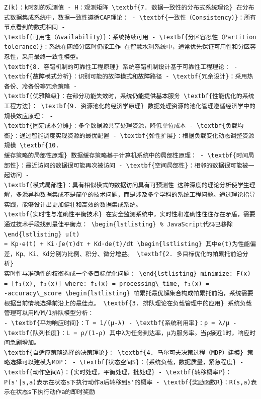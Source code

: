 \begin{verbatim}
Z(k)：k时刻的观测值 - H：观测矩阵 \textbf{7. 数据一致性的分布式系统理论} 在分布式数据集成系统中，数据一致性遵循CAP理论： - \textbf{一致性（Consistency）}：所有节点看到的数据相同 -
\textbf{可用性（Availability）}：系统持续可用 - \textbf{分区容忍性（Partition tolerance）}：系统在网络分区时仍能工作 在智慧水利系统中，通常优先保证可用性和分区容忍性，采用最终一致性模型。
\textbf{8. 容错机制的可靠性工程原理} 系统容错机制设计基于可靠性工程理论： - \textbf{故障模式分析}：识别可能的故障模式和故障路径 - \textbf{冗余设计}：采用热备份、冷备份等冗余策略 -
\textbf{优雅降级}：在部分功能失效时，系统仍能提供基本服务 \textbf{性能优化的系统工程方法}： \textbf{9. 资源池化的经济学原理} 数据处理资源的池化管理遵循经济学中的规模效应原理： -
\textbf{固定成本分摊}：多个数据源共享处理资源，降低单位成本 - \textbf{负载均衡}：通过智能调度实现资源的最优配置 - \textbf{弹性扩展}：根据负载变化动态调整资源规模 \textbf{10.
缓存策略的局部性原理} 数据缓存策略基于计算机系统中的局部性原理： - \textbf{时间局部性}：最近访问的数据很可能再次被访问 - \textbf{空间局部性}：相邻的数据很可能被一起访问 -
\textbf{模式局部性}：具有相似模式的数据访问具有可预测性 这种深度的理论分析使学生理解，多源异构数据集成不是简单的技术问题，而是涉及多个学科的系统工程问题。通过理论指导实践，能够设计出更加健壮和高效的数据集成系统。
\textbf{实时性与准确性平衡技术} 在安全监测系统中，实时性和准确性往往存在矛盾，需要通过技术手段找到最佳平衡点： \begin{lstlisting} % JavaScript代码已移除 \end{lstlisting} u(t)
= Kp·e(t) + Ki·∫e(τ)dτ + Kd·de(t)/dt \begin{lstlisting} 其中e(t)为性能偏差，Kp、Ki、Kd分别为比例、积分、微分增益。 \textbf{2. 多目标优化的帕累托前沿分析}
实时性与准确性的权衡构成一个多目标优化问题： \end{lstlisting} minimize: F(x) = [f₁(x), f₂(x)] where: f₁(x) = processing\_time, f₂(x) =
-accuracy\_score \begin{lstlisting} 帕累托最优解集合构成帕累托前沿，系统需要根据当前情境选择前沿上的最佳点。 \textbf{3. 排队理论在负载管理中的应用} 系统负载管理可以用M/M/1排队模型分析：
- \textbf{平均响应时间}：T = 1/(μ-λ) - \textbf{系统利用率}：ρ = λ/μ - \textbf{队列长度}：L = ρ/(1-ρ) 其中λ为任务到达率，μ为服务率。当ρ接近1时，响应时间急剧增加。
\textbf{自适应策略选择的决策理论}： \textbf{4. 马尔可夫决策过程（MDP）建模} 策略选择可以建模为MDP： - \textbf{状态空间S}：{系统负载，数据质量，紧急程度} -
\textbf{动作空间A}：{实时处理，平衡处理，批处理} - \textbf{转移概率P}：P(s'|s,a)表示在状态s下执行动作a后转移到s'的概率 - \textbf{奖励函数R}：R(s,a)表示在状态s下执行动作a的即时奖励

\end{verbatim}

